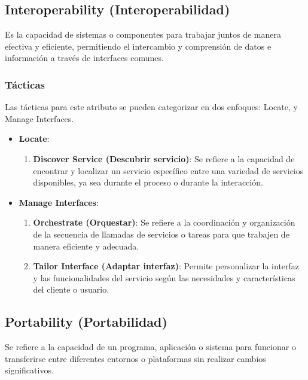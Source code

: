 \documentclass{article}
\begin{document}
		
		\subsection{Interoperability  \small{(Interoperabilidad)}}
		Es la capacidad de sistemas o componentes para trabajar juntos de manera efectiva y eficiente, permitiendo el intercambio y comprensión de datos e información a través de interfaces comunes.
		
		
		\subsubsection{Tácticas}
		Las tácticas para este atributo se pueden categorizar en dos enfoques: Locate, y Manage Interfaces. 
		
		\begin{itemize}		
			\item \textbf{Locate}:
			\begin{enumerate}
				\item \textbf{Discover Service (Descubrir servicio)}: Se refiere a la capacidad de encontrar y localizar un servicio específico entre una variedad de servicios disponibles, ya sea durante el proceso o durante la interacción.
				
			\end{enumerate}
			
			\item \textbf{Manage Interfaces}:
			\begin{enumerate}
				\item \textbf{Orchestrate (Orquestar)}: Se refiere a la coordinación y organización de la secuencia de llamadas de servicios o tareas para que trabajen de manera eficiente y adecuada.
				
				
				
				\item \textbf{Tailor Interface (Adaptar interfaz)}: Permite personalizar la interfaz y las funcionalidades del servicio según las necesidades y características del cliente o usuario.

				
			\end{enumerate}	
			
		\end{itemize}
		
		\subsection{Portability  \small{(Portabilidad)}}
		Se refiere a la capacidad de un programa, aplicación o sistema para funcionar o transferirse entre diferentes entornos o plataformas sin realizar cambios significativos.
		
\end{document}
